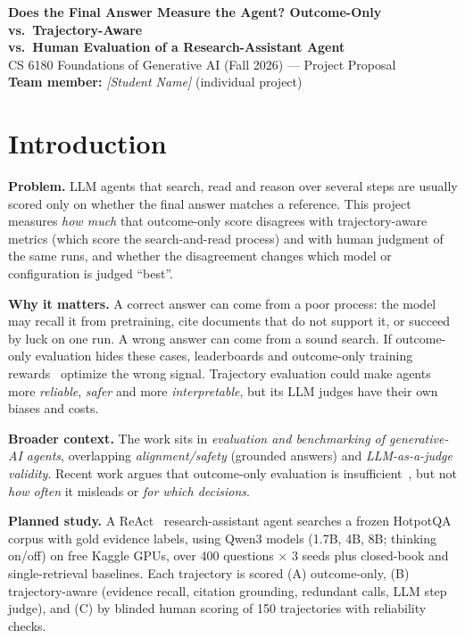 \documentclass[10pt]{article}
\begin{document}
\begin{center}
{\large\bfseries Does the Final Answer Measure the Agent? Outcome-Only vs.\ Trajectory-Aware\\[1pt] vs.\ Human Evaluation of a Research-Assistant Agent}\\[4pt]
CS 6180 Foundations of Generative AI (Fall 2026) --- Project Proposal\\[2pt]
\textbf{Team member:} \textit{[Student Name]} (individual project)
\end{center}

\section{Introduction}

\textbf{Problem.} LLM agents that search, read and reason over several steps are usually scored only on whether the final answer matches a reference. This project measures \emph{how much} that outcome-only score disagrees with trajectory-aware metrics (which score the search-and-read process) and with human judgment of the same runs, and whether the disagreement changes which model or configuration is judged ``best''.

\textbf{Why it matters.} A correct answer can come from a poor process: the model may recall it from pretraining, cite documents that do not support it, or succeed by luck on one run. A wrong answer can come from a sound search. If outcome-only evaluation hides these cases, leaderboards and outcome-only training rewards~\cite{jin2025searchr1} optimize the wrong signal. Trajectory evaluation could make agents more \emph{reliable}, \emph{safer} and more \emph{interpretable}, but its LLM judges have their own biases and costs.

\textbf{Broader context.} The work sits in \emph{evaluation and benchmarking of generative-AI agents}, overlapping \emph{alignment/safety} (grounded answers) and \emph{LLM-as-a-judge validity}. Recent work argues that outcome-only evaluation is insufficient~\cite{yehudai2025survey,chen2026trace}, but not \emph{how often} it misleads or \emph{for which decisions}.

\textbf{Planned study.} A ReAct~\cite{yao2023react} research-assistant agent searches a frozen HotpotQA~\cite{yang2018hotpotqa} corpus with gold evidence labels, using Qwen3 models (1.7B, 4B, 8B; thinking on/off) on free Kaggle GPUs, over 400 questions $\times$ 3 seeds plus closed-book and single-retrieval baselines. Each trajectory is scored (A) outcome-only, (B) trajectory-aware (evidence recall, citation grounding, redundant calls, LLM step judge), and (C) by blinded human scoring of 150 trajectories with reliability checks.
\end{document}
